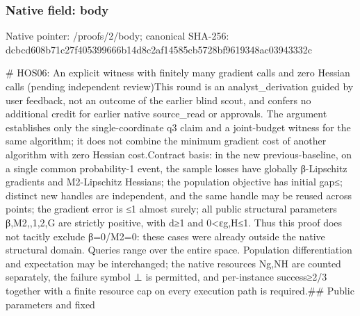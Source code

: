 \documentclass[10pt,a4paper]{article}
\begin{document}
\subsubsection{Native field: body}
Native pointer: /proofs/2/body; canonical SHA-256: dcbcd608b71c27f405399666b14d8c2af14585cb5728bf9619348ac03943332c

\begingroup\raggedright\sloppy \# HOS06:\allowbreak{} An explicit witness with finitely many gradient calls and zero Hessian calls (pending independent review)\newline{}\newline{}This round is an analyst\_\allowbreak{}derivation guided by user feedback,\allowbreak{} not an outcome of the earlier blind scout,\allowbreak{} and confers no additional credit for earlier native source\_\allowbreak{}read or approvals. The argument establishes only the single-coordinate q3 claim and a joint-budget witness for the same algorithm;\allowbreak{} it does not combine the minimum gradient cost of another algorithm with zero Hessian cost.\newline{}\newline{}Contract basis:\allowbreak{} in the new previous-baseline,\allowbreak{} on a single common probability-1 event,\allowbreak{} the sample losses have globally {\AtlasUnicodeText β}\allowbreak{}-Lipschitz gradients and M2-Lipschitz Hessians;\allowbreak{} the population objective has initial gap{\AtlasUnicodeSymbols ≤}\allowbreak{};\allowbreak{} distinct new handles are independent,\allowbreak{} and the same handle may be reused across points;\allowbreak{} the gradient error is {\AtlasUnicodeSymbols ≤}\allowbreak{}1 almost surely;\allowbreak{} all public structural parameters {\AtlasUnicodeText β}\allowbreak{},\allowbreak{}M2,\allowbreak{},\allowbreak{}1,\allowbreak{}2,\allowbreak{}G are strictly positive,\allowbreak{} with d{\AtlasUnicodeSymbols ≥}\allowbreak{}1 and 0<{\AtlasUnicodeText ε}\allowbreak{}g,\allowbreak{}H{\AtlasUnicodeSymbols ≤}\allowbreak{}1. Thus this proof does not tacitly exclude {\AtlasUnicodeText β}\allowbreak{}=\allowbreak{}0/\allowbreak{}M2=\allowbreak{}0:\allowbreak{} these cases were already outside the native structural domain. Queries range over the entire space. Population differentiation and expectation may be interchanged;\allowbreak{} the native resources Ng,\allowbreak{}NH are counted separately,\allowbreak{} the failure symbol {\AtlasUnicodeSymbols ⊥}\allowbreak{} is permitted,\allowbreak{} and per-instance success{\AtlasUnicodeSymbols ≥}\allowbreak{}2/\allowbreak{}3 together with a finite resource cap on every execution path is required.\newline{}\newline{}\#\# Public parameters and fixed 
\end{document}
